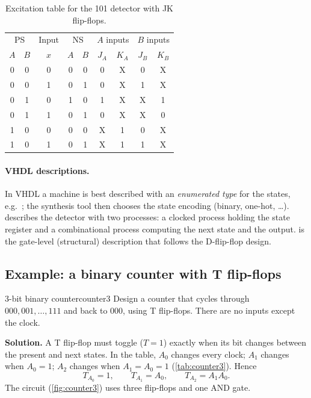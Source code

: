 \begin{table}[htbp]
\centering
\caption{Excitation table for the 101 detector with JK flip-flops.}
\label{tab:seqdet-jk}
\begin{tabular}{cc|c|cc|cc|cc}
\toprule
\multicolumn{2}{c|}{PS} & Input & \multicolumn{2}{c|}{NS} & \multicolumn{2}{c|}{$A$ inputs} & \multicolumn{2}{c}{$B$ inputs}\\
$A$&$B$&$x$&$A$&$B$&$J_A$&$K_A$&$J_B$&$K_B$\\ \midrule
0&0&0&0&0&0&X&0&X\\0&0&1&0&1&0&X&1&X\\
0&1&0&1&0&1&X&X&1\\0&1&1&0&1&0&X&X&0\\
1&0&0&0&0&X&1&0&X\\1&0&1&0&1&X&1&1&X\\ \bottomrule
\end{tabular}
\end{table}

\paragraph{VHDL descriptions.} In VHDL a machine is best described with an \emph{enumerated type} for the states, e.g.\ ; the synthesis tool then chooses the state encoding (binary, one-hot, \dots).  describes the detector with two processes: a clocked process holding the state register and a combinational process computing the next state and the output.  is the gate-level (structural) description that follows the D-flip-flop design.


\subsection{Example: a binary counter with T flip-flops}
\begin{example}{3-bit binary counter}{counter3}
Design a counter that cycles through $000,001,\dots,111$ and back to $000$, using T flip-flops. There are no inputs except the clock.

\textbf{Solution.} A T flip-flop must toggle ($T=1$) exactly when its bit changes between the present and next states. In the table, $A_0$ changes every clock; $A_1$ changes when $A_0=1$; $A_2$ changes when $A_1=A_0=1$ (\cref{tab:counter3}). Hence
\[
 T_{A_0}=1,\qquad T_{A_1}=A_0,\qquad T_{A_2}=A_1A_0 .
\]
The circuit (\cref{fig:counter3}) uses three flip-flops and one AND gate.
\end{example}

